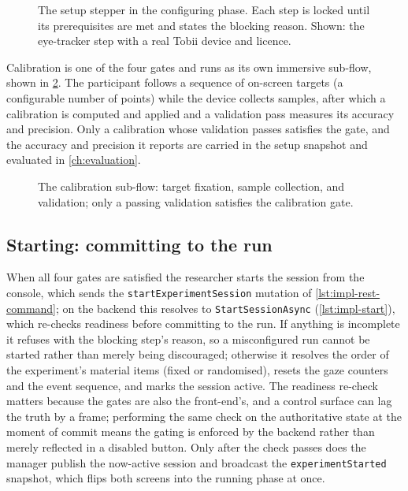 \begin{figure}[htbp]
\centering
{}
\caption[The setup stepper in the configuring phase.]{The setup stepper in the configuring phase. Each step is locked until its prerequisites are met and states the blocking reason. Shown: the eye-tracker step with a real Tobii device and licence.}
\label{fig:impl-setup}
\end{figure}

Calibration is one of the four gates and runs as its own immersive sub-flow, shown in \cref{fig:impl-calibration}.
The participant follows a sequence of on-screen targets (a configurable number of points) while the device collects samples, after which a calibration is computed and applied and a validation pass measures its accuracy and precision.
Only a calibration whose validation passes satisfies the gate, and the accuracy and precision it reports are carried in the setup snapshot and evaluated in \cref{ch:evaluation}.

\begin{figure}[htbp]
\centering
{}
\caption[The calibration sub-flow.]{The calibration sub-flow: target fixation, sample collection, and validation; only a passing validation satisfies the calibration gate.}
\label{fig:impl-calibration}
\end{figure}

\subsection*{Starting: committing to the run}

When all four gates are satisfied the researcher starts the session from the console, which sends the \texttt{startExperimentSession} mutation of \cref{lst:impl-rest-command}; on the backend this resolves to \texttt{StartSessionAsync} (\cref{lst:impl-start}), which re-checks readiness before committing to the run.
If anything is incomplete it refuses with the blocking step's reason, so a misconfigured run cannot be started rather than merely being discouraged; otherwise it resolves the order of the experiment's material items (fixed or randomised), resets the gaze counters and the event sequence, and marks the session active.
The readiness re-check matters because the gates are also the front-end's, and a control surface can lag the truth by a frame; performing the same check on the authoritative state at the moment of commit means the gating is enforced by the backend rather than merely reflected in a disabled button.
Only after the check passes does the manager publish the now-active session and broadcast the \texttt{experimentStarted} snapshot, which flips both screens into the running phase at once.

